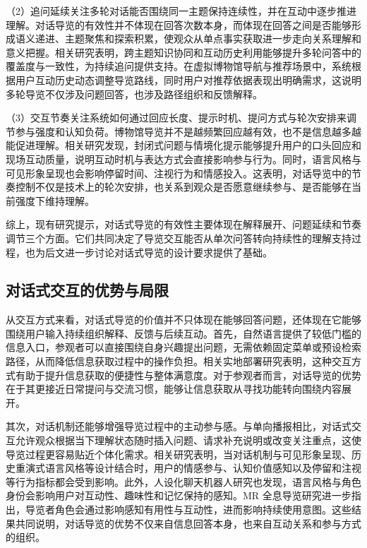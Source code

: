 （2）追问延续关注多轮对话能否围绕同一主题保持连续性，并在互动中逐步推进理解。对话导览的有效性并不体现在回答次数本身，而体现在回答之间是否能够形成语义递进、主题聚焦和探索积累，使观众从单点事实获取进一步走向关系理解和意义把握。相关研究表明，跨主题知识协同和互动历史利用能够提升多轮问答中的覆盖度与一致性，为持续追问提供支持\cite{varitimiadis2021}。在虚拟博物馆导航与推荐场景中，系统根据用户互动历史动态调整导览路线，同时用户对推荐依据表现出明确需求，这说明多轮导览不仅涉及问题回答，也涉及路径组织和反馈解释\cite{tsitseklis2023}。

（3）交互节奏关注系统如何通过回应长度、提示时机、提问方式与轮次安排来调节参与强度和认知负荷。博物馆导览并不是越频繁回应越有效，也不是信息越多越能促进理解。相关研究发现，封闭式问题与情境化提示能够提升用户的口头回应和现场互动质量，说明互动时机与表达方式会直接影响参与行为\cite{gasteiger2021}。同时，语言风格与可见形象呈现也会影响停留时间、注视行为和情感投入\cite{noh2021}。这表明，对话导览中的节奏控制不仅是技术上的轮次安排，也关系到观众是否愿意继续参与、是否能够在当前强度下维持理解。

综上，现有研究提示，对话式导览的有效性主要体现在解释展开、问题延续和节奏调节三个方面。它们共同决定了导览交互能否从单次问答转向持续性的理解支持过程，也为后文进一步讨论对话式导览的设计要求提供了基础。

\subsection{对话式交互的优势与局限}
从交互方式来看，对话式导览的价值并不只体现在能够回答问题，还体现在它能够围绕用户输入持续组织解释、反馈与后续互动。首先，自然语言提供了较低门槛的信息入口，参观者可以直接围绕自身兴趣提出问题，无需依赖固定菜单或预设检索路径，从而降低信息获取过程中的操作负担。相关实地部署研究表明，这种交互方式有助于提升信息获取的便捷性与整体满意度\cite{duguleana2020}。对于参观者而言，对话导览的优势在于其更接近日常提问与交流习惯，能够让信息获取从寻找功能转向围绕内容展开。

其次，对话机制还能够增强导览过程中的主动参与感。与单向播报相比，对话式交互允许观众根据当下理解状态随时插入问题、请求补充说明或改变关注重点，这使导览过程更容易贴近个体化需求。相关研究表明，当对话机制与可见形象呈现、历史重演式语言风格等设计结合时，用户的情感参与、认知价值感知以及停留和注视等行为指标都会受到影响\cite{noh2021}。此外，人设化聊天机器人研究也发现，语言风格与角色身份会影响用户对互动性、趣味性和记忆保持的感知\cite{sovic2025,suicmez2025}。MR 全息导览研究进一步指出，导览者角色会通过影响感知有用性与互动性，进而影响持续使用意图\cite{hammady2021}。这些结果共同说明，对话导览的优势不仅来自信息回答本身，也来自互动关系和参与方式的组织。

